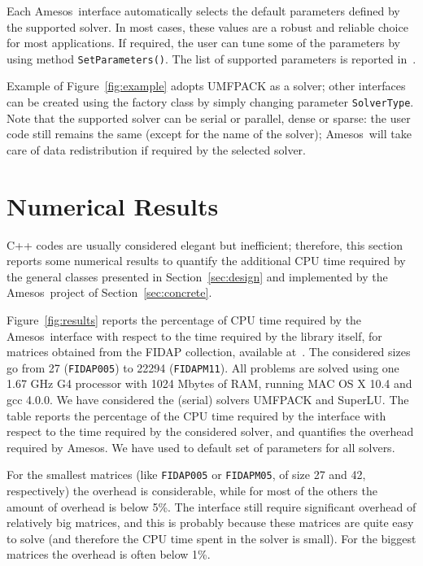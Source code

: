 \documentclass[acmtocl]{acmtrans2m}
\newcommand{\amesos}{{\sc Amesos}}
\begin{document}
Each \amesos\ interface automatically selects the default parameters defined by
the supported solver. In most cases, these values are a robust and reliable
choice for most applications. If required, the user can tune some of the
parameters by using method \verb!SetParameters()!. The list of supported
parameters is reported in~\cite{Amesos-Reference-Guide}.

Example of Figure~\ref{fig:example} adopts UMFPACK as a solver; other
interfaces can be created using the factory class by simply changing parameter
{\tt SolverType}. Note that the supported solver can be serial or parallel,
  dense or sparse: the user code still remains the same (except for the name
                                                         of the solver);
  \amesos\ will take care of data redistribution if required by the selected
  solver. 

\section{Numerical Results}
\label{sec:numerical}

C++ codes are usually considered elegant but inefficient; therefore, this
section reports some numerical results to quantify the additional CPU time
required by the general classes presented in Section~\ref{sec:design} and
implemented by the \amesos\ project of Section~\ref{sec:concrete}.

Figure~\ref{fig:results} reports the percentage of CPU time required by the
\amesos\
interface with respect to the time required by the library itself, 
  for matrices obtained from the FIDAP collection, available
at~\cite{boisvert97matrix}. The considered sizes go from 27 
({\tt FIDAP005}) to 22294 ({\tt FIDAPM11}). All problems are solved using one
1.67 GHz G4 processor with 1024 Mbytes of RAM, running MAC OS X 10.4 and gcc
4.0.0. We have considered the (serial) solvers UMFPACK and
SuperLU. The table reports the percentage of the CPU time required by the
interface with respect to the time required by the considered solver, and
quantifies the overhead required by \amesos. We have used to default set of
parameters for all solvers.

For the smallest matrices (like \verb!FIDAP005! or \verb!FIDAPM05!, of size
27 and 42, respectively)
the overhead is considerable, while for most of the others the amount of
overhead is below 5\%. The interface still require significant overhead of
relatively big matrices, and this is probably because these matrices are quite
easy to solve (and therefore the CPU time spent in the solver is small).
For the biggest matrices the overhead is often below 1\%.
\end{document}
